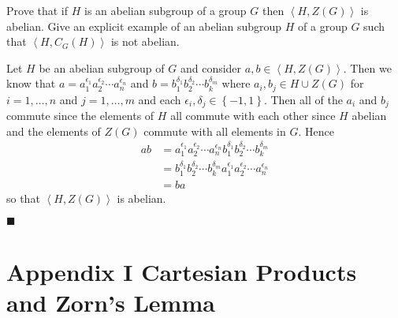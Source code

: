 \documentclass[12pt]{article}
\renewcommand{\qed}{\hfill$\blacksquare$}
\renewenvironment{proof}{\begin{addmargin}[1em]{0em}\begin{newproof}}{\end{newproof}\end{addmargin}\qed}
\newenvironment{problem}[2][Exercise]{\begin{trivlist}
\item[\hskip \labelsep {\bfseries #1}\hskip \labelsep {\bfseries #2.}]}{\end{trivlist}}
\begin{document}
\begin{problem}{2.4.3}
Prove that if $H$ is an abelian subgroup of a group $G$ then $\left\langle H,Z\left(G\right)\right\rangle$ is abelian. Give an explicit example of an abelian subgroup $H$ of a group $G$ such that $\left\langle H,C_G\left(H\right)\right\rangle$ is not abelian.
\end{problem}
\begin{proof}
Let $H$ be an abelian subgroup of $G$ and consider $a,b \in \left\langle H,Z\left(G\right)\right\rangle$. Then we know that $a=a_1^{\epsilon_1}a_2^{\epsilon_2}\cdots a_n^{\epsilon_n}$ and $b=b_1^{\delta_1}b_2^{\delta_2}\cdots b_k^{\delta_m}$ where $
a_i,b_j \in H\cup Z\left(G\right)$ for $i=1,\ldots,n$ and $j=1,\ldots,m$ and each $\epsilon_i,\delta_j\in \left\{-1,1\right\}$. Then all of the $a_i$ and $b_j$ commute since the elements of $H$ all commute with each other since $H$ abelian and the elements of $Z\left(G\right)$ commute with all elements in $G$. Hence
\begin{equation}\begin{split}
ab & = a_1^{\epsilon_1}a_2^{\epsilon_2}\cdots a_n^{\epsilon_n}b_1^{\delta_1}b_2^{\delta_2}\cdots b_k^{\delta_m} \\
& = b_1^{\delta_1}b_2^{\delta_2}\cdots b_k^{\delta_m}a_1^{\epsilon_1}a_2^{\epsilon_2}\cdots a_n^{\epsilon_n} \\
& = ba
\end{split}\end{equation}
so that $\left\langle H,Z\left(G\right)\right\rangle$ is abelian.


\end{proof}
















\newpage
\section*{Appendix I Cartesian Products and Zorn's Lemma}
\end{document}
